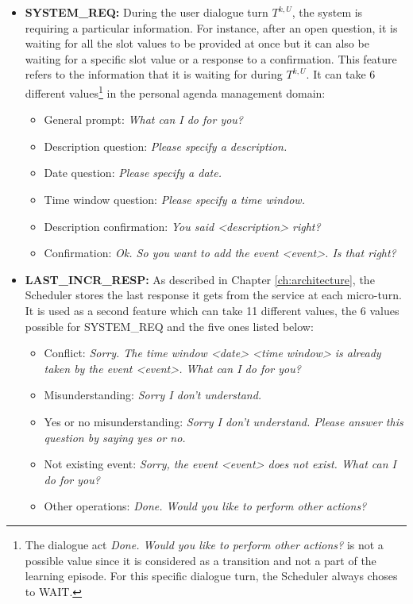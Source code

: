         \begin{itemize}
        	\item \textbf{SYSTEM\_REQ:} During the user dialogue turn $T^{k,U}$, the system is requiring a particular information. For instance, after an open question, it is waiting for all the slot values to be provided at once but it can also be waiting for a specific slot value or a response to a confirmation. This feature refers to the information that it is waiting for during $T^{k,U}$. It can take 6 different values\footnote{The dialogue act \textit{Done. Would you like to perform other actions?} is not a possible value since it is considered as a transition and not a part of the learning episode. For this specific dialogue turn, the Scheduler always choses to WAIT.} in the personal agenda management domain:
					
						\begin{itemize}
							\item General prompt: \textit{What can I do for you?}
							\item Description question: \textit{Please specify a description.}
							\item Date question: \textit{Please specify a date.}
							\item Time window question: \textit{Please specify a time window.}
							\item Description confirmation: \textit{You said <description> right?}
							\item Confirmation: \textit{Ok. So you want to add the event <event>. Is that right?}
						\end{itemize}
					
            \item \textbf{LAST\_INCR\_RESP:} As described in Chapter \ref{ch:architecture}, the Scheduler stores the last response it gets from the service at each micro-turn. It is used as a second feature which can take 11 different values, the 6 values possible for SYSTEM\_REQ and the five ones listed below:
						
						\begin{itemize}
							\item Conflict: \textit{Sorry. The time window <date> <time window> is already taken by the event <event>. What can I do for you?}
							\item Misunderstanding: \textit{Sorry I don't understand.}
							\item Yes or no misunderstanding: \textit{Sorry I don't understand. Please answer this question by saying yes or no.}
							\item Not existing event: \textit{Sorry, the event <event> does not exist. What can I do for you?}
							\item Other operations: \textit{Done. Would you like to perform other actions?}
						\end{itemize}
						

\end{itemize}

